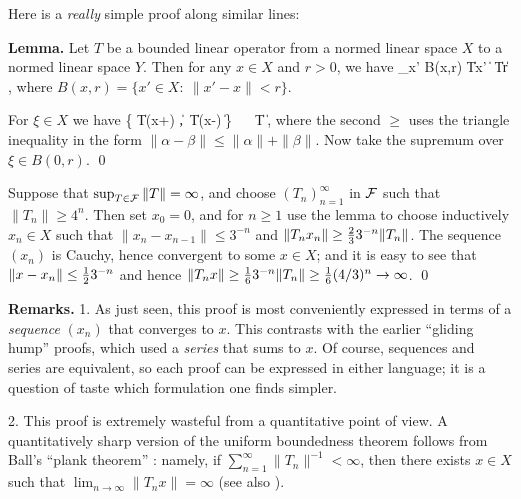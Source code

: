 \documentclass[12pt]{article}
\begin{document}
Here is a {\em really}\/ simple proof
along similar lines:

\bigskip

{\bf Lemma.}   Let $T$ be a bounded linear operator
from a normed linear space $X$ to a normed linear space $Y$.
Then for any $x \in X$ and $r > 0$, we have
\be
   \sup\limits_{x' \in B(x,r)} \| Tx' \| \;\ge\; \|T\| r  \;,
\ee
where $B(x,r) = \{x' \in X \colon\: \|x'-x\| < r \}$.

\smallskip

\proof
For $\xi \in X$ we have
\be
   \max\bigl\{ \| T(x+\xi) \| ,\, \| T(x-\xi) \| \bigr\}
   \;\,\ge\;\,
   \smhalf \bigl[ \| T(x+\xi) \| + \| T(x-\xi) \| \bigr]
   \;\,\ge\;\,
   \| T \xi \|  \;,
   \quad
\ee
where the second $\ge$ uses the triangle inequality
in the form $\| \alpha-\beta \| \le \|\alpha\| + \|\beta\|$.
Now take the supremum over $\xi \in B(0,r)$.
\qed

\vspace*{-4mm}

Suppose that $\sup_{T \in {\mathcal{F}}} \|T\| = \infty$,
and choose $(T_n)_{n=1}^\infty$ in ${\mathcal{F}}$ such that $\|T_n\| \ge 4^n$.
Then set $x_0 = 0$, and for $n \ge 1$ use the lemma to
choose inductively $x_n \in X$
such that $\| x_n - x_{n-1} \| \le 3^{-n}$
and $\| T_n x_n \| \ge {\textstyle{2\over 3}} 3^{-n} \| T_n \|$.
The sequence $(x_n)$ is Cauchy, hence convergent to some $x \in X$;
and it is easy to see that
$\| x-x_n \| \le {\textstyle{1\over 2}} 3^{-n}$ and hence
$\| T_n x \| \ge {\textstyle{1\over 6}} 3^{-n} \| T_n \| \ge {\textstyle{1\over 6}} (4/3)^n
 \to \infty$.
\qed

\medskip

{\bf Remarks.}
1.  As just seen, this proof is most conveniently expressed in terms of a
{\em sequence}\/ $(x_n)$ that converges to $x$.
This contrasts with the earlier ``gliding hump'' proofs,
which used a {\em series}\/ that sums to $x$.
Of course, sequences and series are equivalent,
so each proof can be expressed in either language;
it is a question of taste which formulation one finds simpler.

2.  This proof is extremely wasteful from a quantitative point of view.
A quantitatively sharp version of the uniform boundedness theorem
follows from Ball's ``plank theorem'' \cite{Ball_91}:
namely, if $\sum_{n=1}^\infty \|T_n\|^{-1} < \infty$,
then there exists $x \in X$ such that
$\lim_{n\to\infty} \| T_n x \| = \infty$
(see also \cite{Muller_09}).
\end{document}
